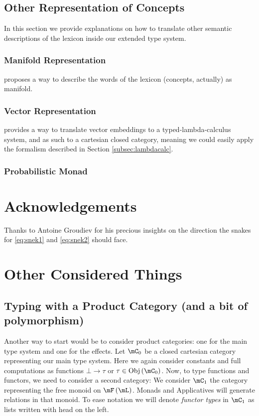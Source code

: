 \documentclass[math, english, info]{cours}
\begin{document}
\subsection{Other Representation of Concepts}
In this section we provide explanations on how to translate other semantic descriptions of the lexicon inside our extended type system.

\subsubsection{Manifold Representation}
 proposes a way to describe the words of the lexicon (concepts, actually) as manifold.

\subsubsection{Vector Representation}
 provides a way to translate vector embeddings to a typed-lambda-calculus system, and as such to a cartesian closed category, meaning we could easily apply the formalism described in Section \ref{subsec:lambdacalc}.

\subsubsection{Probabilistic Monad}

\section*{Acknowledgements}
Thanks to Antoine Groudiev for his precious insights on the direction the snakes for \eqref{eq:snek1} and \eqref{eq:snek2} should face.
\clearpage
\appendix
\section{Other Considered Things}
\subsection{Typing with a Product Category (and a bit of polymorphism)}
Another way to start would be to consider product categories: one for the main type system and one for the effects.
Let $\mC_{0}$ be a closed cartesian category representing our main type system.
Here we again consider constants and full computations as functions $\bot \to \tau$ or $\tau \in \mathrm{Obj}\left( \mC_{0} \right)$.
Now, to type functions and functors, we need to consider a second category:
We consider $\mC_{1}$ the category representing the free monoid on $\mF\left( \mL \right)$.
Monads and Applicatives will generate relations in that monoid.
To ease notation we will denote \emph{functor types} in $\mC_{1}$ as lists written with head on the left.
\end{document}
